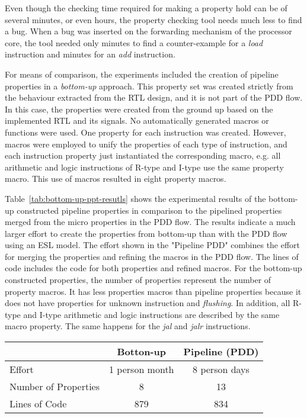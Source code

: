 Even though the checking time required for making a property hold can be of several minutes, or even hours, the property checking tool needs much less to find a bug. When a bug was inserted on the forwarding mechanism of the processor core, the tool needed only  minutes to find a counter-example for a \textit{load} instruction and   minutes for an \textit{add} instruction.

For means of comparison, the experiments included the creation of pipeline properties in a \textit{bottom-up} approach. This property set was created strictly from the behaviour extracted from the RTL design, and it is not part of the PDD flow. In this case, the properties were created from the ground up based on the implemented RTL and its signals. No automatically generated macros or functions were used. One property for each instruction was created. However, macros were employed to unify the properties of each type of instruction, and each instruction property just instantiated the corresponding macro, e.g. all arithmetic and logic instructions of R-type and I-type use the same property macro. This use of macros resulted in eight property macros.

Table~\ref{tab:bottom-up-ppt-resutls} shows the experimental results of the bottom-up constructed pipeline properties in comparison to the pipelined properties merged from the micro properties in the PDD flow. The results indicate a much larger effort to create the properties from bottom-up than with the PDD flow using an ESL model. The effort shown in the "Pipeline PDD" combines the effort for merging the properties and refining the macros in the PDD flow. The lines of code includes the code for both properties and refined macros. For the bottom-up constructed properties, the number of properties represent the number of property macros. It has less properties macros than pipeline properties because it does not have properties for unknown instruction and \textit{flushing}. In addition, all R-type and I-type arithmetic and logic instructions are described by the same macro property. The same happens for the \textit{jal} and \textit{jalr} instructions. 

\begin{table*}[htb!] 
	\centering 
	\caption{Results from comparison between pipeline properties created in a bottom-up approach and pipeline properties generated using the merging algorithm within the PDD flow.} 
	\label{tab:bottom-up-ppt-resutls}
	\begin{tabular}{p{5cm} c c} 
		  &  \textbf{Botton-up} & \textbf{Pipeline (PDD)} \\     
		\hline	
		Effort  &  1 person month &  8 person days\\
		Number of Properties  &  8 & 13 \\
		Lines of Code  & 879  &  834\\
	\end{tabular}
\end{table*}

